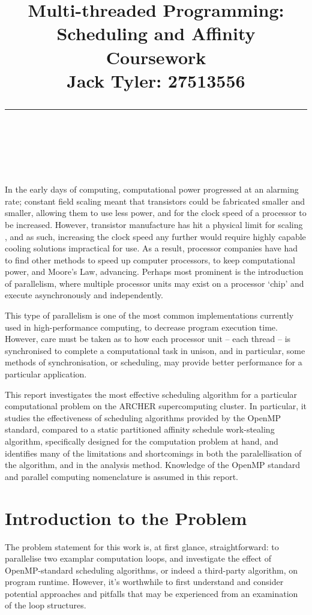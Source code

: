 \documentclass{article} %
\title{\raggedright
\normalfont \normalsize 
\huge Multi-threaded Programming: Scheduling and Affinity Coursework \\[1em]
\normalsize \normalfont Jack Tyler: 27513556 \\
\rule{\linewidth}{.5pt}  \\[6pt]
}
\begin{document}
\maketitle

In the early days of computing, computational power progressed at an alarming rate; constant field scaling meant that transistors could be fabricated smaller and smaller, allowing them to use less power, and for the clock speed of a processor to be increased.
However, transistor manufacture has hit a physical limit for scaling \citep{Mcfarland1995}, and as such, increasing the clock speed any further would require highly capable cooling solutions impractical for use.
As a result, processor companies have had to find other methods to speed up computer processors, to keep computational power, and Moore's Law, advancing.
Perhaps most prominent is the introduction of parallelism, where multiple processor units may exist on a processor `chip' and execute asynchronously and independently.

This type of parallelism is one of the most common implementations currently used in high-performance computing, to decrease program execution time.
However, care must be taken as to how each processor unit -- each thread -- is synchronised to complete a computational task in unison, and in particular,
some methods of synchronisation, or scheduling, may provide better performance for a particular application.

This report investigates the most effective scheduling algorithm for a particular computational problem on the ARCHER supercomputing cluster.
In particular, it studies the effectiveness of scheduling algorithms provided by the OpenMP standard, compared to a static partitioned affinity schedule work-stealing algorithm, specifically designed for the computation problem at hand, and identifies many of the limitations and shortcomings in both the paralellisation of the algorithm, and in the analysis method. Knowledge of the OpenMP standard and parallel computing nomenclature is assumed in this report.

\section*{Introduction to the Problem}

The problem statement for this work is, at first glance, straightforward: to parallelise two examplar computation loops, and investigate the effect of OpenMP-standard scheduling algorithms, or indeed a third-party algorithm, on program runtime.
However, it's worthwhile to first understand and consider potential approaches and pitfalls that may be experienced from an examination of the loop structures.
\end{document}
